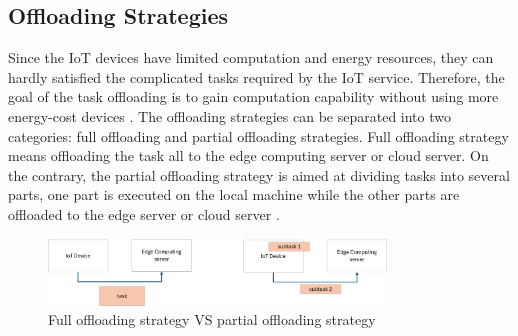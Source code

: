 \documentclass[a4paper,11pt]{article}
\begin{document}

\subsection{Offloading Strategies}
Since the IoT devices have limited computation and energy resources, they can hardly satisfied the complicated tasks required by the IoT service. Therefore, the goal of the task offloading is to gain computation capability without using more energy-cost devices \cite{aim_offloading}. The offloading strategies can be separated into two categories: full offloading and partial offloading strategies. Full offloading strategy means offloading the task all to the edge computing server or cloud server. On the contrary, the partial offloading strategy is aimed at dividing tasks into several parts, one part is executed on the local machine while the other parts are offloaded to the edge server or cloud server \cite{full_partial}. 

\begin{figure}[h]
        \centering
        \includegraphics[width=0.8\textwidth]{offloading.png}
        \caption{Full offloading strategy VS partial offloading strategy}
\end{figure}
\end{document}
